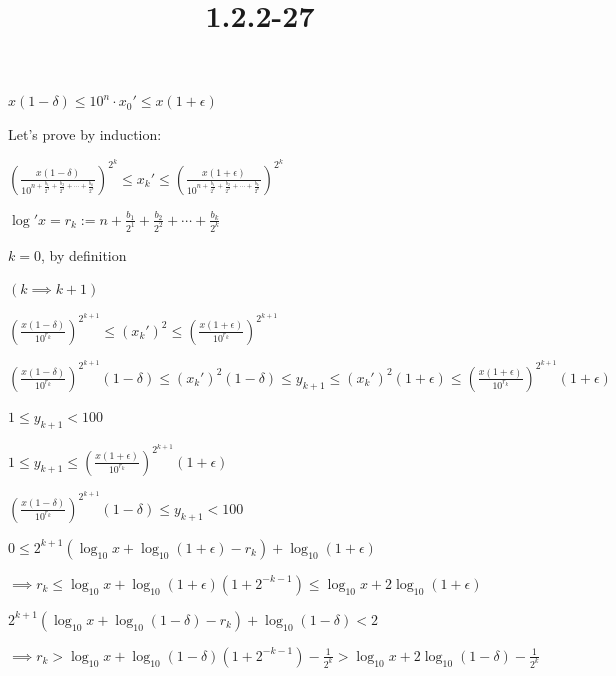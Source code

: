 \documentclass{article}
\title{1.2.2-27}
\begin{document}
\maketitle

$x(1-\delta) \leq 10^n\cdot x_0' \leq x(1+\epsilon)$

Let's prove by induction:

$(\frac{x(1-\delta)}{10^{n+\frac{b_1}{2^1}+\frac{b_2}{2^2}+\cdots+\frac{b_k}{2^k}}})^{2^k} \leq x_k' \leq (\frac{x(1+\epsilon)}{10^{n+\frac{b_1}{2^1}+\frac{b_2}{2^2}+\cdots+\frac{b_k}{2^k}}})^{2^k}$

$\log'{x} = r_k:= n+\frac{b_1}{2^1}+\frac{b_2}{2^2}+\cdots+\frac{b_k}{2^k}$

$k = 0$, by definition

$(k \implies k + 1)$

$(\frac{x(1-\delta)}{10^{r_k}})^{2^{k+1}} \leq (x_k')^2 \leq (\frac{x(1+\epsilon)}{10^{r_k}})^{2^{k+1}}$

$(\frac{x(1-\delta)}{10^{r_k}})^{2^{k+1}} (1-\delta) \leq (x_k')^2 (1-\delta) \leq y_{k+1} \leq (x_k')^2 (1+\epsilon) \leq (\frac{x(1+\epsilon)}{10^{r_k}})^{2^{k+1}} (1+\epsilon)$

$1 \leq y_{k+1} < 100$

$1 \leq y_{k+1} \leq (\frac{x(1+\epsilon)}{10^{r_k}})^{2^{k+1}} (1+\epsilon)$

$(\frac{x(1-\delta)}{10^{r_k}})^{2^{k+1}} (1-\delta) \leq y_{k+1} < 100$

$0 \leq 2^{k+1} (\log_{10}{x} + \log_{10}{(1+\epsilon)} - r_k) + \log_{10}{(1+\epsilon)}$

$\implies r_k \leq \log_{10}{x} + \log_{10}{(1+\epsilon)}(1+2^{-k-1}) \leq \log_{10}{x} + 2\log_{10}{(1+\epsilon)}$

$2^{k+1} (\log_{10}{x} + \log_{10}{(1-\delta)} - r_k) + \log_{10}{(1-\delta)} < 2$

$\implies r_k > \log_{10}{x} + \log_{10}{(1-\delta)}(1+2^{-k-1}) - \frac{1}{2^k} > \log_{10}{x} + 2\log_{10}(1-\delta) - \frac{1}{2^k}$
\end{document}
